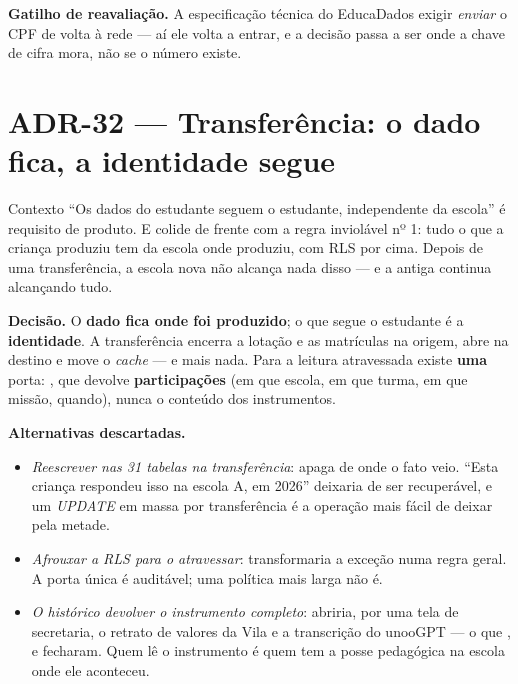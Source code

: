 \textbf{Gatilho de reavaliação.} A especificação técnica do EducaDados exigir
\emph{enviar} o CPF de volta à rede --- aí ele volta a entrar, e a decisão passa a
ser onde a chave de cifra mora, não se o número existe.

\section{ADR-32 --- Transferência: o dado fica, a identidade segue}
\label{adr:transferencia}

\begin{especificacao}{Contexto}
\enquote{Os dados do estudante seguem o estudante, independente da escola} é requisito de
produto. E colide de frente com a regra inviolável nº 1: tudo o que a criança
produziu tem  da escola onde produziu, com RLS por cima. Depois de
uma transferência, a escola nova não alcança nada disso --- e a antiga continua
alcançando tudo.
\end{especificacao}

\textbf{Decisão.} O \textbf{dado fica onde foi produzido}; o que segue o estudante é a
\textbf{identidade}. A transferência encerra a lotação e as matrículas na origem,
abre na destino e move o \emph{cache}  --- e mais nada. Para
a leitura atravessada existe \textbf{uma} porta: ,
que devolve \textbf{participações} (em que escola, em que turma, em que missão,
quando), nunca o conteúdo dos instrumentos.

\textbf{Alternativas descartadas.}
\begin{itemize}
  \item \emph{Reescrever  nas 31 tabelas na transferência}: apaga
    de onde o fato veio. \enquote{Esta criança respondeu isso na escola A, em
    2026} deixaria de ser recuperável, e um \emph{UPDATE} em massa por
    transferência é a operação mais fácil de deixar pela metade.
  \item \emph{Afrouxar a RLS para o  atravessar}: transformaria a
    exceção numa regra geral. A porta única é auditável; uma política mais larga
    não é.
  \item \emph{O histórico devolver o instrumento completo}: abriria, por uma tela
    de secretaria, o retrato de valores da Vila e a transcrição do unooGPT --- o
    que ,  e  fecharam. Quem lê o
    instrumento é quem tem a posse pedagógica na escola onde ele aconteceu.
\end{itemize}

